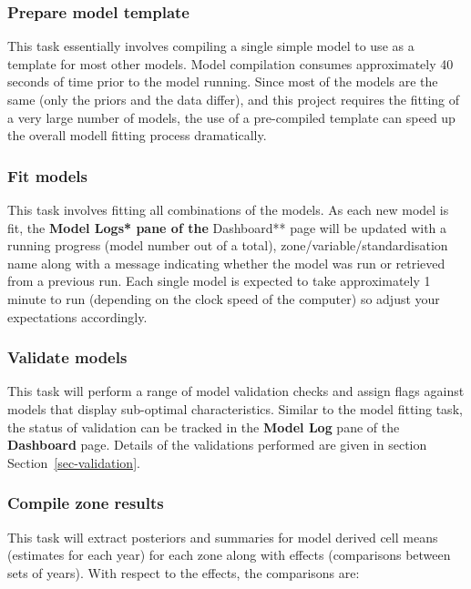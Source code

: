 \documentclass[
  8pt,
  a4paper]{article}
\begin{document}
\subsubsection{Prepare model template}\label{prepare-model-template}

This task essentially involves compiling a single simple model to use as
a template for most other models. Model compilation consumes
approximately 40 seconds of time prior to the model running. Since most
of the models are the same (only the priors and the data differ), and
this project requires the fitting of a very large number of models, the
use of a pre-compiled template can speed up the overall modell fitting
process dramatically.

\subsubsection{Fit models}\label{fit-models}

This task involves fitting all combinations of the models. As each new
model is fit, the \textbf{Model Logs* pane of the }Dashboard** page will
be updated with a running progress (model number out of a total),
zone/variable/standardisation name along with a message indicating
whether the model was run or retrieved from a previous run. Each single
model is expected to take approximately 1 minute to run (depending on
the clock speed of the computer) so adjust your expectations
accordingly.

\subsubsection{Validate models}\label{validate-models}

This task will perform a range of model validation checks and assign
flags against models that display sub-optimal characteristics. Similar
to the model fitting task, the status of validation can be tracked in
the \textbf{Model Log} pane of the \textbf{Dashboard} page. Details of
the validations performed are given in section
Section~\ref{sec-validation}.

\subsubsection{Compile zone results}\label{compile-zone-results}

This task will extract posteriors and summaries for model derived cell
means (estimates for each year) for each zone along with effects
(comparisons between sets of years). With respect to the effects, the
comparisons are:
\end{document}
